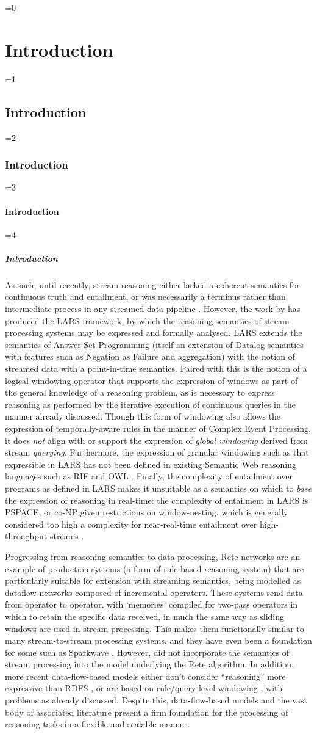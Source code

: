\documentclass[twocolumn,preprint,3p,number]{elsarticle}
\theoremstyle{plain}
\theoremstyle{definition}
\newcounter{nestingdepth}
\newenvironment{nestedsection}[2]{
  \ifnum\value{nestingdepth}=0
    \chapter{#1}
  \else
    \ifnum\value{nestingdepth}=1
      \section{#1}
    \else
      \ifnum\value{nestingdepth}=2
        \subsection{#1}
      \else
        \ifnum\value{nestingdepth}=3
          \subsubsection{#1}
        \else
          \ifnum\value{nestingdepth}=4
            \paragraph{#1}
          \else
            \PackageError{nestedsections}{Maximum nesting level exceeded!}{uh oh!}
          \fi
        \fi
      \fi
    \fi
  \fi
  \addtocounter{nestingdepth}{1}
  \label{sec:#2}
}{\addtocounter{nestingdepth}{-1}}
\begin{document}
\begin{nestedsection}{Introduction}{intro}
  As such, until recently, stream reasoning either lacked a coherent semantics for continuous truth and entailment, or was necessarily a terminus rather than intermediate process in any streamed data pipeline \citep{valle09streamReasoningSummary}.
  However, the work by \citet{LARS} has produced the LARS framework, by which the reasoning semantics of stream processing systems may be expressed and formally analysed.
  LARS extends the semantics of Answer Set Programming (itself an extension of Datalog semantics with features such as Negation as Failure and aggregation) with the notion of streamed data with a point-in-time semantics.
  Paired with this is the notion of a logical windowing operator that supports the expression of windows as part of the general knowledge of a reasoning problem, as is necessary to express reasoning as performed by the iterative execution of continuous queries in the manner already discussed.
  Though this form of windowing also allows the expression of temporally-aware rules in the manner of Complex Event Processing, it does \emph{not} align with or support the expression of \emph{global windowing} derived from stream \emph{querying}.
  Furthermore, the expression of granular windowing such as that expressible in LARS has not been defined in existing Semantic Web reasoning languages such as RIF \citep{w3crif} and OWL \citep{w3cowl2}.
  Finally, the complexity of entailment over programs as defined in LARS makes it unsuitable as a semantics on which to \emph{base} the expression of reasoning in real-time:
  the complexity of entailment in LARS is PSPACE, or co-NP given restrictions on window-nesting, which is generally considered too high a complexity for near-real-time entailment over high-throughput streams \citep{mileo15webSR}.
  
  Progressing from reasoning semantics to data processing, Rete networks \citep{forgy79} are an example of production systems (a form of rule-based reasoning system) that are particularly suitable for extension with streaming semantics, being modelled as dataflow networks composed of incremental operators.
  These systems send data from operator to operator, with `memories' compiled for two-pass operators in which to retain the specific data received, in much the same way as sliding windows are used in stream processing.
  This makes them functionally similar to many stream-to-stream processing systems, and they have even been a foundation for some such as Sparkwave \citep{sparkwave}.
  However, \citet{forgy79} did not incorporate the semantics of stream processing into the model underlying the Rete algorithm.
  In addition, more recent data-flow-based models either don't consider ``reasoning'' more expressive than RDFS \citep{sparkwave}, or are based on rule/query-level windowing \citep{C-SPARQL,walavalkar08streamingkb}, with problems as already discussed.
  Despite this, data-flow-based models and the vast body of associated literature present a firm foundation for the processing of reasoning tasks in a flexible and scalable manner.


\end{nestedsection}
\end{document}
